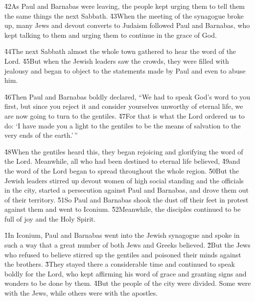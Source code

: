\v{42}As Paul and Barnabas were leaving, the people kept urging them to tell them the same things the next Sabbath. \v{43}When the meeting of the synagogue broke up, many Jews and devout converts to Judaism followed Paul and Barnabas, who kept talking to them and urging them to continue in the grace of God.

\v{44}The next Sabbath almost the whole town gathered to hear the word of the Lord. \v{45}But when the Jewish leaders saw the crowds, they were filled with jealousy and began to object to the statements made by Paul and even to abuse him.

\v{46}Then Paul and Barnabas boldly declared, ``We had to speak God's word to you first, but since you reject it and consider yourselves unworthy of eternal life, we are now going to turn to the gentiles. \v{47}For that is what the Lord ordered us to do: `I have made you a light to the gentiles to be the means of salvation to the very ends of the earth.'\,''

\v{48}When the gentiles heard this, they began rejoicing and glorifying the word of the Lord. Meanwhile, all who had been destined to eternal life believed, \v{49}and the word of the Lord began to spread throughout the whole region. \v{50}But the Jewish leaders stirred up devout women of high social standing and the officials in the city, started a persecution against Paul and Barnabas, and drove them out of their territory. \v{51}So Paul and Barnabas shook the dust off their feet in protest against them and went to Iconium. \v{52}Meanwhile, the disciples continued to be full of joy and the Holy Spirit.

\v{1}In Iconium, Paul and Barnabas went into the Jewish synagogue and spoke in such a way that a great number of both Jews and Greeks believed. \v{2}But the Jews who refused to believe stirred up the gentiles and poisoned their minds against the brothers. \v{3}They stayed there a considerable time and continued to speak boldly for the Lord, who kept affirming his word of grace and granting signs and wonders to be done by them. \v{4}But the people of the city were divided. Some were with the Jews, while others were with the apostles.

